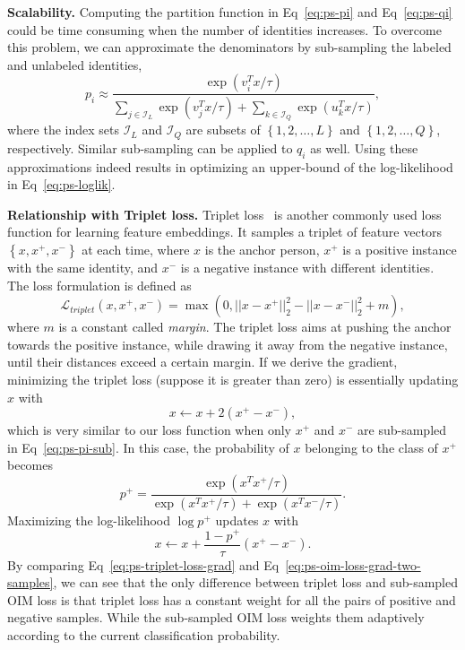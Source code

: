 {\color{red}\textbf{Scalability.} Computing the partition function in Eq~\eqref{eq:ps-pi} and Eq~\eqref{eq:ps-qi} could be time consuming when the number of identities increases. To overcome this problem, we can approximate the denominators by sub-sampling the labeled and unlabeled identities,
\begin{equation} \label{eq:ps-pi-sub}
p_i\approx\frac{\exp(v_i^Tx/\tau)}{\sum_{j\in\mathcal{I}_L}\exp(v_j^Tx/\tau)+\sum_{k\in\mathcal{I}_Q}\exp(u_k^Tx/\tau)},
\end{equation}
where the index sets $\mathcal{I}_L$ and $\mathcal{I}_Q$ are subsets of $\left\{1,2,\dots,L\right\}$ and $\left\{1,2,\dots,Q\right\}$, respectively. Similar sub-sampling can be applied to $q_i$ as well. Using these approximations indeed results in optimizing an upper-bound of the log-likelihood in Eq~\eqref{eq:ps-loglik}.

\textbf{Relationship with Triplet loss.} Triplet loss~\cite{schroff2015facenet} is another commonly used loss function for learning feature embeddings. It samples a triplet of feature vectors $\left\{x,x^+,x^-\right\}$ at each time, where $x$ is the anchor person, $x^+$ is a positive instance with the same identity, and $x^-$ is a negative instance with different identities. The loss formulation is defined as
\begin{equation} \label{eq:ps-triplet-loss}
\mathcal{L}_{triplet}\left(x,x^+,x^-\right)=\max\left(0, ||x-x^+||_2^2 - ||x-x^-||_2^2 + m\right),
\end{equation}
where $m$ is a constant called \emph{margin}. The triplet loss aims at pushing the anchor towards the positive instance, while drawing it away from the negative instance, until their distances exceed a certain margin. If we derive the gradient, minimizing the triplet loss (suppose it is greater than zero) is essentially updating $x$ with
\begin{equation} \label{eq:ps-triplet-loss-grad}
x\gets x + 2(x^+-x^-),
\end{equation}
which is very similar to our loss function when only $x^+$ and $x^-$ are sub-sampled in Eq~\eqref{eq:ps-pi-sub}. In this case, the probability of $x$ belonging to the class of $x^+$ becomes
\begin{equation} \label{eq:ps-p-pos}
p^+=\frac{\exp(x^Tx^+/\tau)}{\exp(x^Tx^+/\tau)+\exp(x^Tx^-/\tau)}.
\end{equation}
Maximizing the log-likelihood $\log p^+$ updates $x$ with
\begin{equation} \label{eq:ps-oim-loss-grad-two-samples}
x\gets x + \frac{1-p^+}{\tau}(x^+-x^-).
\end{equation}
By comparing Eq~\eqref{eq:ps-triplet-loss-grad} and Eq~\eqref{eq:ps-oim-loss-grad-two-samples}, we can see that the only difference between triplet loss and sub-sampled OIM loss is that triplet loss has a constant weight for all the pairs of positive and negative samples. While the sub-sampled OIM loss weights them adaptively according to the current classification probability.

}
